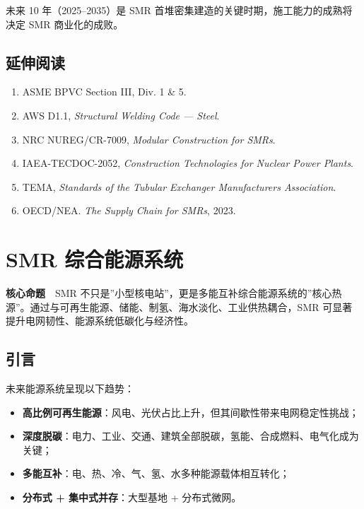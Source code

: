 \documentclass[
  UTF8,
  scheme=plain,
  fontsize=10pt,
  openany
]{ctexbook}
\begin{document}
未来 10 年（2025--2035）是 SMR
首堆密集建造的关键时期，施工能力的成熟将决定 SMR 商业化的成败。

\section{延伸阅读}\label{ux5ef6ux4f38ux9605ux8bfb-1}

\begin{enumerate}
\def\labelenumi{\arabic{enumi}.}
\tightlist
\item
  ASME BPVC Section III, Div. 1 \& 5.
\item
  AWS D1.1, \emph{Structural Welding Code --- Steel}.
\item
  NRC NUREG/CR-7009, \emph{Modular Construction for SMRs}.
\item
  IAEA-TECDOC-2052, \emph{Construction Technologies for Nuclear Power
  Plants}.
\item
  TEMA, \emph{Standards of the Tubular Exchanger Manufacturers
  Association}.
\item
  OECD/NEA. \emph{The Supply Chain for SMRs}, 2023.
\end{enumerate}

\cleardoublepage

\chapter{SMR
综合能源系统}\label{smr-ux7efcux5408ux80fdux6e90ux7cfbux7edf}

\begin{epigraph}

\textbf{核心命题}　SMR
不只是''小型核电站''，更是多能互补综合能源系统的''核心热源''。通过与可再生能源、储能、制氢、海水淡化、工业供热耦合，SMR
可显著提升电网韧性、能源系统低碳化与经济性。

\end{epigraph}

\section{引言}\label{ux5f15ux8a00-12}

未来能源系统呈现以下趋势：

\begin{itemize}
\tightlist
\item
  \textbf{高比例可再生能源}：风电、光伏占比上升，但其间歇性带来电网稳定性挑战；
\item
  \textbf{深度脱碳}：电力、工业、交通、建筑全部脱碳，氢能、合成燃料、电气化成为关键；
\item
  \textbf{多能互补}：电、热、冷、气、氢、水多种能源载体相互转化；
\item
  \textbf{分布式 + 集中式并存}：大型基地 + 分布式微网。
\end{itemize}
\end{document}
